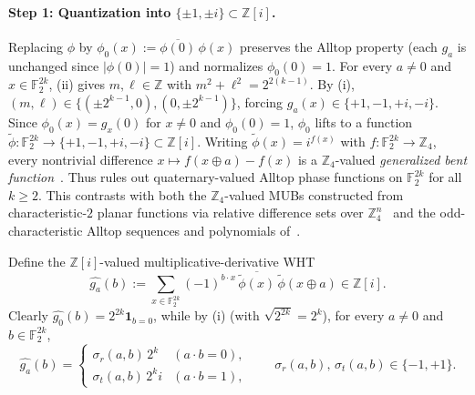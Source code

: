 \documentclass[11pt,a4paper]{article}
\theoremstyle{plain}
\theoremstyle{definition}
\theoremstyle{remark}
\newcommand{\Z}{\mathbb{Z}}
\newcommand{\F}{\mathbb{F}}
\newcommand{\Zi}{\mathbb{Z}[i]}
\newcommand{\abs}[1]{\lvert#1\rvert}
\newcommand{\indic}[1]{\mathbf{1}_{#1}}
\numberwithin{equation}{section}
\begin{document}
\paragraph{Step 1: Quantization into $\{\pm 1, \pm i\} \subset \Zi$.}
Replacing $\phi$ by $\phi_0(x) := \overline{\phi(0)}\,\phi(x)$ preserves the Alltop property (each $g_a$ is unchanged since $\abs{\phi(0)} = 1$) and normalizes $\phi_0(0) = 1$. For every $a \neq 0$ and $x \in \F_2^{2k}$, (ii) gives $m, \ell \in \Z$ with $m^2 + \ell^2 = 2^{2(k-1)}$. By (i), $(m, \ell) \in \{(\pm 2^{k-1}, 0), (0, \pm 2^{k-1})\}$, forcing $g_a(x) \in \{+1, -1, +i, -i\}$. Since $\phi_0(x) = g_x(0)$ for $x \neq 0$ and $\phi_0(0) = 1$, $\phi_0$ lifts to a function $\tilde{\phi} : \F_2^{2k} \to \{+1, -1, +i, -i\} \subset \Zi$. Writing $\tilde{\phi}(x) = i^{f(x)}$ with $f : \F_2^{2k} \to \Z_4$, every nontrivial difference $x \mapsto f(x \oplus a) - f(x)$ is a $\Z_4$-valued \emph{generalized bent function}~\cite{kumar1985generalized,schmidt2009quaternary,sole2009connections}. Thus  rules out quaternary-valued Alltop phase functions on $\F_2^{2k}$ for all $k \ge 2$. This contrasts with both the $\Z_4$-valued MUBs constructed from characteristic-$2$ planar functions via relative difference sets over $\Z_4^n$~\cite{zhou2013relative,schmidt2014planar,abdukhalikov2015symplectic} and the odd-characteristic Alltop sequences and polynomials of~\cite{alltop1980complex,hall2013family}.

Define the $\Zi$-valued multiplicative-derivative WHT
\[
  \widehat{g_a}(b) := \sum_{x \in \F_2^{2k}} (-1)^{b \cdot x}\,\overline{\tilde{\phi}(x)}\,\tilde{\phi}(x \oplus a) \in \Zi.
\]
Clearly $\widehat{g_0}(b) = 2^{2k}\indic{b = 0}$, while by (i) (with $\sqrt{2^{2k}} = 2^k$), for every $a \neq 0$ and $b \in \F_2^{2k}$,
\begin{equation}\label{eq:ghat-zi}
  \widehat{g_a}(b) = \begin{cases}
    \sigma_r(a, b)\,2^k & (a \cdot b = 0), \\
    \sigma_t(a, b)\,2^k i & (a \cdot b = 1),
  \end{cases}
  \qquad \sigma_r(a, b),\, \sigma_t(a, b) \in \{-1, +1\}.
\end{equation}
\end{document}
